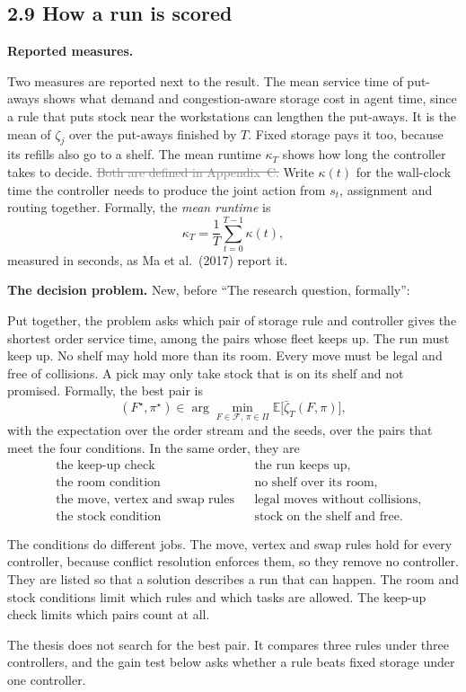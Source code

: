 \documentclass[11pt,a4paper]{article}
\newcommand{\new}[1]{\textcolor{newc}{#1}}
\newcommand{\old}[1]{\textcolor{gray}{\sout{#1}}}
\newenvironment{greenblock}{\color{newc}}{}
\begin{document}
\subsection*{2.9 How a run is scored}

\textbf{Reported measures.}

Two measures are reported next to the result. The mean service time of
put-aways shows what demand and congestion-aware storage cost in agent time,
since a rule that puts stock near the workstations can lengthen the
put-aways. \new{It is the mean of $\zeta_j$ over the put-aways finished by
$T$. Fixed storage pays it too, because its refills also go to a shelf.} The
mean runtime $\kappa_T$ shows how long the controller takes to decide.
\old{Both are defined in Appendix~C.} \new{Write $\kappa(t)$ for the
wall-clock time the controller needs to produce the joint action from $s_t$,
assignment and routing together. Formally, the \emph{mean runtime} is}
\begin{greenblock}
\[
  \kappa_T = \frac{1}{T}\sum_{t=0}^{T-1} \kappa(t) ,
  \tag{runtime}
\]
measured in seconds, as Ma et al.\ (2017) report it.
\end{greenblock}

\textbf{The decision problem.} New, before ``The research question,
formally'':

\begin{greenblock}
Put together, the problem asks which pair of storage rule and controller
gives the shortest order service time, among the pairs whose fleet keeps up.
The run must keep up. No shelf may hold more than its room. Every move must
be legal and free of collisions. A pick may only take stock that is on its
shelf and not promised. Formally, the best pair is
\[
  (F^{\star}, \pi^{\star}) \in
      \arg\min_{F \in \mathcal{F},\, \pi \in \Pi} \mathbb{E}\bigl[\bar\zeta_T(F,\pi)\bigr],
  \tag{decision problem}
\]
with the expectation over the order stream and the seeds, over the pairs
that meet the four conditions. In the same order, they are
\begin{align*}
  &\text{the keep-up check} && \text{the run keeps up,}\\
  &\text{the room condition} && \text{no shelf over its room,}\\
  &\text{the move, vertex and swap rules} && \text{legal moves without collisions,}\\
  &\text{the stock condition} && \text{stock on the shelf and free.}
\end{align*}

The conditions do different jobs. The move, vertex and swap rules hold for
every controller, because conflict resolution enforces them, so they remove
no controller. They are listed so that a solution describes a run that can
happen. The room and stock conditions limit which rules and which tasks are
allowed. The keep-up check limits which pairs count at all.

The thesis does not search for the best pair. It compares three rules under
three controllers, and the gain test below asks whether a rule beats fixed
storage under one controller.
\end{greenblock}
\end{document}
